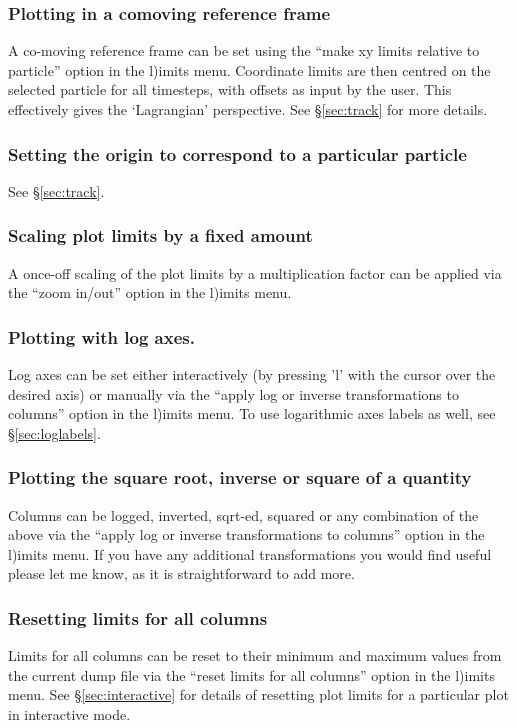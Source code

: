 \documentclass[a4paper,10pt]{article}
\begin{document}
\subsubsection{ Plotting in a comoving reference frame}
 A co-moving reference frame can be set using the ``make xy limits relative to particle'' option in the l)imits menu. Coordinate limits are then centred on the selected particle for all timesteps, with offsets as input by the user. This
effectively gives the `Lagrangian' perspective. See \S\ref{sec:track} for more details.

\subsubsection{ Setting the origin to correspond to a particular particle}
 See \S\ref{sec:track}.

\subsubsection{ Scaling plot limits by a fixed amount}
 A once-off scaling of the plot limits by a multiplication factor can be applied via the ``zoom in/out'' option in the l)imits menu.

\subsubsection{ Plotting with log axes.}
 Log axes can be set either interactively (by pressing 'l' with the cursor over the desired axis) or manually via the ``apply log or inverse transformations to columns'' option in the l)imits menu. To use logarithmic axes labels as well, see \S\ref{sec:loglabels}.

\subsubsection{ Plotting the square root, inverse or square of a quantity}
 Columns can be logged, inverted, sqrt-ed, squared or any combination of the above via the ``apply log or inverse transformations to columns'' option in the l)imits menu. If you have any additional transformations you would find useful please let me know, as it is straightforward to add more.

\subsubsection{ Resetting limits for all columns}
\label{sec:resetlimits}
 Limits for all columns can be reset to their minimum and maximum values from the current dump file via the ``reset limits for all columns'' option in the l)imits menu. See \S\ref{sec:interactive} for details of resetting plot limits for a particular plot in interactive mode. 
\end{document}
